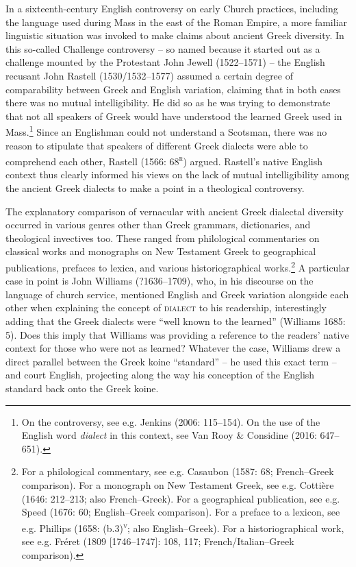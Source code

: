 \begin{styleStandard}
In a sixteenth-century English controversy on early Church practices, including the language used during Mass in the east of the Roman Empire, a more familiar linguistic situation was invoked to make claims about ancient Greek diversity. In this so-called Challenge controversy – so named because it started out as a challenge mounted by the Protestant John Jewell (1522–1571) – the English recusant John Rastell (1530/1532–1577) assumed a certain degree of comparability between Greek and English variation, claiming that in both cases there was no mutual intelligibility. He did so as he was trying to demonstrate that not all speakers of Greek would have understood the learned Greek used in Mass.\footnote{ On the controversy, see e.g. Jenkins (2006: 115–154). On the use of the English word \textit{dialect} in this context, see Van Rooy \& Considine (2016: 647–651).} Since an Englishman could not understand a Scotsman, there was no reason to stipulate that speakers of different Greek dialects were able to comprehend each other, Rastell (1566: 68\textsc{\textsuperscript{r}}) argued. Rastell’s native English context thus clearly informed his views on the lack of mutual intelligibility among the ancient Greek dialects to make a point in a theological controversy.
\end{styleStandard}

\begin{styleStandard}
The explanatory comparison of vernacular with ancient Greek dialectal diversity occurred in various genres other than Greek grammars, dictionaries, and theological invectives too. These ranged from philological commentaries on classical works and monographs on New Testament Greek to geographical publications, prefaces to lexica, and various historiographical works.\footnote{ For a philological commentary, see e.g. Casaubon (1587: 68; French–Greek comparison). For a monograph on New Testament Greek, see e.g. Cottière (1646: 212–213; also French–Greek). For a geographical publication, see e.g. Speed (1676: 60; English–Greek comparison). For a preface to a lexicon, see e.g. Phillips (1658: (b.3)\textsuperscript{v}\textsc{;} also English–Greek). For a historiographical work, see e.g. Fréret (1809 [1746–1747]: 108, 117; French/Italian–Greek comparison).} A particular case in point is John Williams (?1636–1709), who, in his discourse on the language of church service, mentioned English and Greek variation alongside each other when explaining the concept of \textsc{dialect} to his readership, interestingly adding that the Greek dialects were “well known to the learned” (Williams 1685: 5). Does this imply that Williams was providing a reference to the readers’ native context for those who were not as learned? Whatever the case, Williams drew a direct parallel between the Greek koine “standard” – he used this exact term – and court English, projecting along the way his conception of the English standard back onto the Greek koine.
\end{styleStandard}

